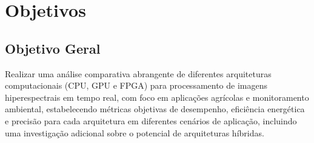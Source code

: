 \section{Objetivos}\label{sec:objetivos}

\subsection{Objetivo Geral}
Realizar uma análise comparativa abrangente de diferentes arquiteturas computacionais (CPU, GPU e FPGA) para processamento de imagens hiperespectrais em tempo real, com foco em aplicações agrícolas e monitoramento ambiental, estabelecendo métricas objetivas de desempenho, eficiência energética e precisão para cada arquitetura em diferentes cenários de aplicação, incluindo uma investigação adicional sobre o potencial de arquiteturas híbridas.


